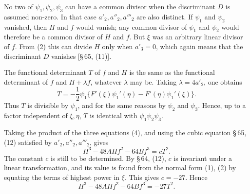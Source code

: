 \documentclass[11pt]{article}
\begin{document}
No two of $\psi_1,\psi_2,\psi_3$ can have a common divisor when the discriminant $D$ is assumed non-zero. In that case $a'_2,a''_2,a'''_2$ are also distinct. If $\psi_1$ and $\psi_2$ vanished, then $H$ and $f$ would vanish; any common divisor of $\psi_1$ and $\psi_2$ would therefore be a common divisor of $H$ and $f$. But $\xi$ was an arbitrary linear divisor of $f$. From (2) this can divide $H$ only when $a'_3=0$, which again means that the discriminant $D$ vanishes [\S\,65, (11)].

The functional determinant $T$ of $f$ and $H$ is the same as the functional determinant of $f$ and $H+\lambda f$, whatever $\lambda$ may be. Taking $\lambda=4a'_2$, one obtains
\[
 T=-\frac12\psi_1\{F'(\xi)\psi_1'(\eta)-F'(\eta)\psi_1'(\xi)\}.
\]
Thus $T$ is divisible by $\psi_1$, and for the same reasons by $\psi_2$ and $\psi_3$. Hence, up to a factor independent of $\xi,\eta$, $T$ is identical with $\psi_1\psi_2\psi_3$.

Taking the product of the three equations (4), and using the cubic equation \S\,65, (12) satisfied by $a'_2,a''_2,a'''_2$, gives
\[
 H^3-48AHf^2-64Bf^3=cT^2.
\]
The constant $c$ is still to be determined. By \S\,64, (12), $c$ is invariant under a linear transformation, and its value is found from the normal form (1), (2) by equating the terms of highest power in $\xi$. This gives $c=-27$. Hence
\begin{equation}
 H^3-48AHf^2-64Bf^3=-27T^2.
\tag{5}
\end{equation}
\end{document}
